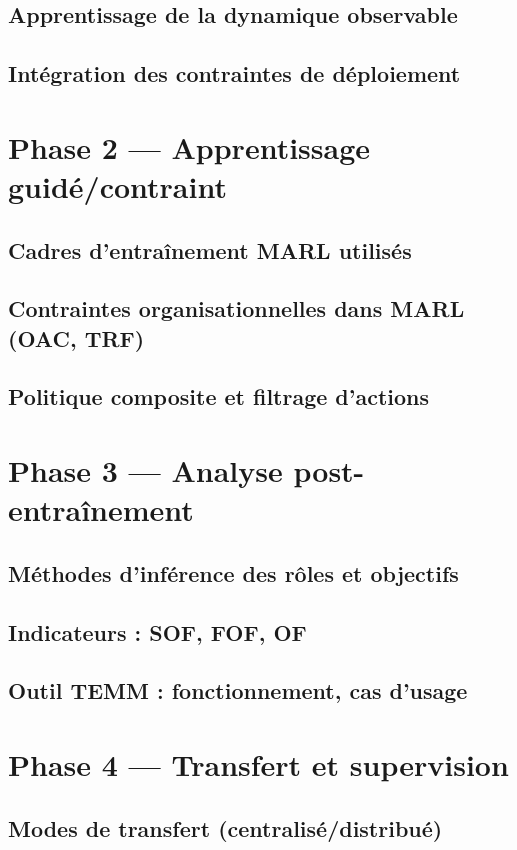 \documentclass[ twoside,openright,titlepage,numbers=noenddot,headinclude,%
                footinclude=true,cleardoublepage=empty,abstractoff, %
                BCOR=5mm,paper=a4,fontsize=11pt,%
                french,american,%
                ]{scrreprt}
\begin{document}
\section{Apprentissage de la dynamique observable}
\section{Intégration des contraintes de déploiement}

\chapter{Phase 2 — Apprentissage guidé/contraint}
\section{Cadres d'entraînement MARL utilisés}
\section{Contraintes organisationnelles dans MARL (OAC, TRF)}
\section{Politique composite et filtrage d'actions}

\chapter{Phase 3 — Analyse post-entraînement}
\section{Méthodes d'inférence des rôles et objectifs}
\section{Indicateurs : SOF, FOF, OF}
\section{Outil TEMM : fonctionnement, cas d'usage}

\chapter{Phase 4 — Transfert et supervision}
\section{Modes de transfert (centralisé/distribué)}
\end{document}
